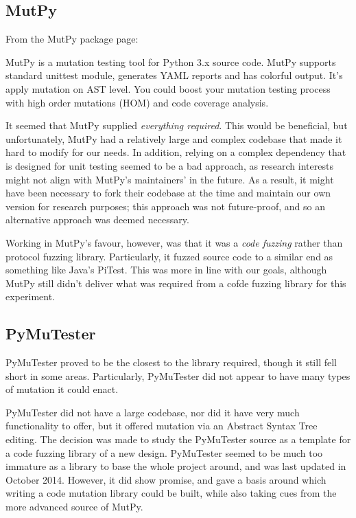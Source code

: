 \subsection{MutPy}
\label{fuzzing_mutpy}
From the MutPy package page: %
\begin{displayquote}
MutPy is a mutation testing tool for Python 3.x source code. MutPy supports standard unittest module, generates YAML reports and has colorful output. It’s apply mutation on AST level. You could boost your mutation testing process with high order mutations (HOM) and code coverage analysis.
\end{displayquote}\par
It seemed that MutPy supplied \emph{everything required}. This would be beneficial, but unfortunately, MutPy had a relatively large and complex codebase that made it hard to modify for our needs. In addition, relying on a complex dependency that is designed for unit testing seemed to be a bad approach, as research interests might not align with MutPy's maintainers' in the future. As a result, it might have been necessary to fork their codebase at the time and maintain our own version for research purposes; this approach was not future-proof, and so an alternative approach was deemed necessary. \par
Working in MutPy's favour, however, was that it was a \emph{code fuzzing} rather than protocol fuzzing library. Particularly, it fuzzed source code to a similar end as something like Java's PiTest. This was more in line with our goals, although MutPy still didn't deliver what was required from a cofde fuzzing library for this experiment. \par%

\subsection{PyMuTester}
\label{fuzzing_pymutester}
PyMuTester proved to be the closest to the library required, though it still fell short in some areas. Particularly, PyMuTester did not appear to have many types of mutation it could enact. \par
PyMuTester did not have a large codebase, nor did it have very much functionality to offer, but it offered mutation via an Abstract Syntax Tree editing. The decision was made to study the PyMuTester source as a template for a code fuzzing library of a new design. PyMuTester seemed to be much too immature as a library to base the whole project around, and was last updated in October 2014. However, it did show promise, and gave a basis around which writing a code mutation library could be built, while also taking cues from the more advanced source of MutPy.  \par%


